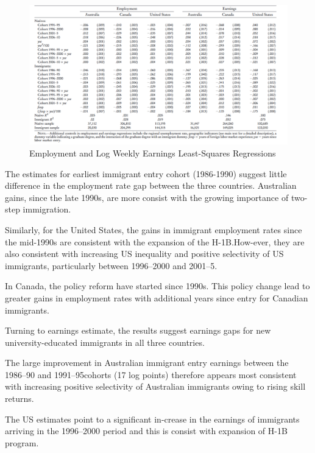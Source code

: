 \documentclass[../root]{subfiles}
\begin{document}
     
    \begin{figure}
        \centering
        \includegraphics[width = \linewidth]{0828sugiyama/Table_4.png}
        \caption{Employment and Log Weekly Earnings Least-Squares Regressions}
        \label{fig:my_label}
    \end{figure}
    
    The estimates for earliest immigrant entry cohort (1986-1990) suggest little difference in the employment rate gap between the three countries. Australian gains, since the late 1990s, are more consist with the growing importance of two-step immigration.
    
    Similarly, for the United States, the gains in immigrant employment rates since the mid-1990s are consistent with the expansion of the H-1B.How-ever, they are also consistent with increasing US inequality and positive selectivity of US immigrants, particularly between 1996–2000 and 2001–5.
    
    
    In Canada, the policy reform have started since 1990s. This policy change lead to greater gains in employment rates with additional years since entry for Canadian immigrants.  
    
    Turning to earnings estimate, the results suggest earnings gaps for new university-educated immigrants in all three countries.
    
    The large improvement in Australian immigrant entry earnings between the 1986–90 and 1991–95cohorts (17 log points) therefore appears most consistent with increasing positive selectivity of Australian immigrants owing to rising skill returns.
    
    The US estimates point to a significant in-crease in the earnings of immigrants arriving in the 1996–2000 period and this is consist with expansion of H-1B program.
    
\end{document}
